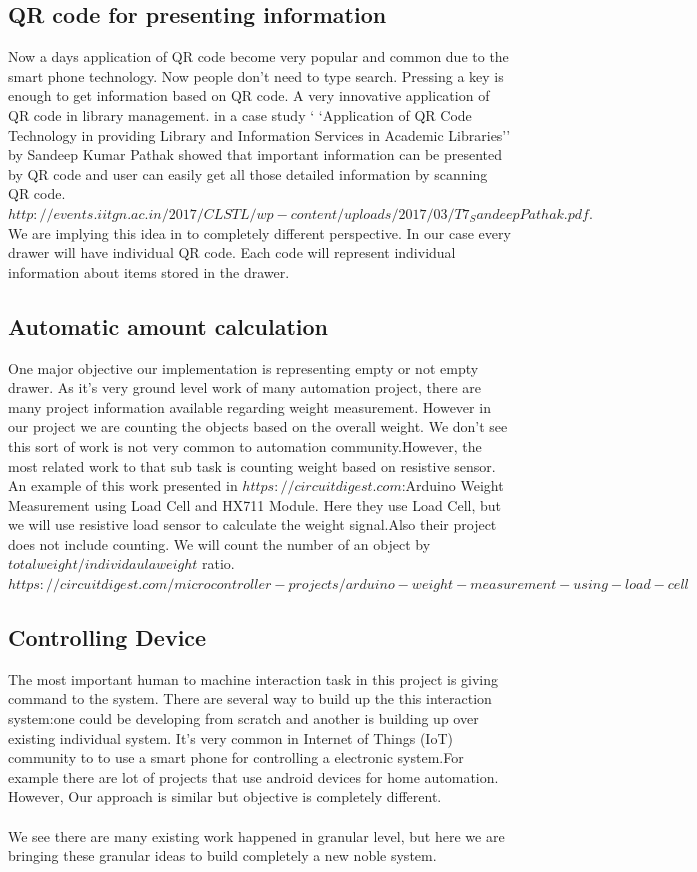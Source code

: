 \documentclass{sigchi}
\begin{document}
\subsection{QR code for presenting information}
Now a days application of QR code become very popular and common due to the smart phone technology. Now people don't need to type search. Pressing a key is enough to get information based on QR code. A very innovative application of QR code in library management. in a case study ` `Application of QR Code Technology in providing Library and Information Services in Academic Libraries'' by  Sandeep
Kumar Pathak showed that important information can be presented by QR code and user can easily get all those detailed information by scanning QR code. $http://events.iitgn.ac.in/2017/CLSTL/wp-content/uploads/2017/03/T7_SandeepPathak.pdf.$
We are implying this idea in to completely different perspective. In our case every drawer will have individual QR code. Each code will represent individual information about items stored in the drawer. 
\subsection{Automatic amount calculation}
One major objective our implementation is representing empty or not empty drawer. As it's very ground level work of many automation project, there are many project information available regarding weight measurement. However in our project we are counting the objects based on the overall weight. We don't see this sort of work is not very common to automation community.However, the most related work to that sub task is counting weight based on resistive sensor. An example of this work presented in $https://circuitdigest.com$:Arduino Weight Measurement using Load Cell and HX711 Module. Here they use Load Cell, but we will use resistive load sensor to calculate the weight signal.Also their project does not include counting. We will count the number of an object by $totalweight/individaula weight$ ratio. 
$https://circuitdigest.com/microcontroller-projects/arduino-weight-measurement-using-load-cell$
\subsection{Controlling Device}
The most important human to machine interaction task in this project is giving command to the system. There are several way to build up the this interaction system:one could be developing from scratch and another is building up over existing individual system. It's very common in Internet of Things (IoT) community to to use a smart phone for controlling a electronic system.For example there are lot of projects that use android devices for home automation. However, Our approach is similar but objective is completely different.
\\
\\
We see there are many existing work happened in granular level, but here we are bringing these granular ideas to build completely a new noble system.
\end{document}
